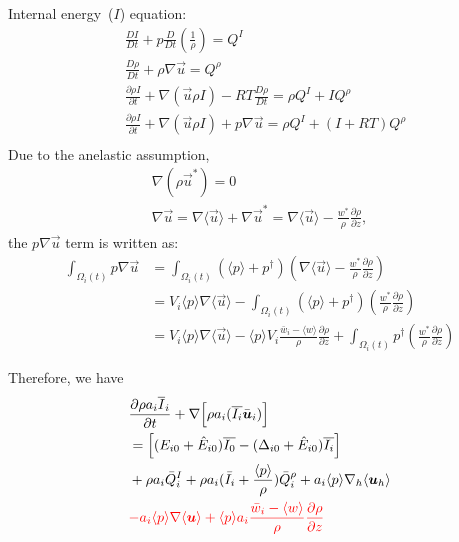 \documentclass{report}
\begin{document}
\newpage
Internal energy~($I$) equation:
\begin{align*}
 &\frac{D I}{D t} + p\frac{D}{Dt}\left(\frac{1}{\rho}\right) = Q^{I}\\
 &\frac{D \rho}{D t} + \rho\nabla \vec{u}  = Q^{\rho}\\
 &\frac{\partial \rho I}{\partial t} + \nabla\left(\vec{u}\rho I\right) - RT \frac{D\rho}{Dt} = \rho Q^{I} + IQ^{\rho}\\
 &\frac{\partial \rho I}{\partial t} + \nabla\left(\vec{u}\rho I\right) + p \nabla \vec{u}  = \rho Q^{I} + (I+RT)Q^{\rho}\\
\end{align*}
Due to the anelastic assumption, 
\begin{align*}
    \nabla (\rho \vec{u}^{*}) = 0\\
    \nabla \vec{u} = \nabla \langle\vec{u}\rangle + \nabla \vec{u}^* = \nabla \langle\vec{u}\rangle - \frac{w^{*}}{\rho}\frac{\partial \rho}{\partial z},
\end{align*} 
the $p \nabla \vec{u}$ term is written as:
\begin{align*}
\int_{\Omega_i(t)} p \nabla\vec{u} &= 
    \int_{\Omega_i(t)} (\langle p\rangle + p^{\dagger}) (\nabla \langle\vec{u}\rangle - \frac{w^{*}}{\rho}\frac{\partial \rho}{\partial z})\\
    &= V_i \langle p\rangle \nabla \langle\vec{u}\rangle - \int_{\Omega_i(t)} (\langle p\rangle + p^{\dagger}) (  \frac{w^{*}}{\rho}\frac{\partial \rho}{\partial z})\\
    &= V_i \langle p\rangle \nabla \langle\vec{u}\rangle - \langle p\rangle V_i  \frac{\bar{w}_i - \langle w \rangle}{\rho}\frac{\partial \rho}{\partial z} +
    \int_{\Omega_i(t)}  p^{\dagger} (  \frac{w^{*}}{\rho}\frac{\partial \rho}{\partial z})
\end{align*}

Therefore, we have 
\begin{align*}
&\frac{\partial \rho a_i \overline{I}_i}{\partial t} 
 + \nabla\Big[\rho a_i(\overline{I_i} \bar{\vec{u}}_i)\Big] \\
 &= \Big[(E_{i0} + \hat{E}_{i0}) \overline{I_0}  - (\Delta_{i0} + \hat{E}_{i0}) \overline{I_i} \Big]\\
 &+ \rho a_i \bar{Q}_i^{I} + \rho a_i (\bar{I}_i + \frac{\langle p\rangle}{\rho})\bar{Q}_i^{\rho} +  a_i \langle p \rangle \nabla_h \langle\vec{u}_h\rangle\\
    &  {\color{red}  -a_i  \langle p \rangle\nabla \langle \vec{u} \rangle  +  \langle p\rangle a_i  \frac{\bar{w}_i - \langle w \rangle}{\rho}\frac{\partial \rho}{\partial z} } \\
\end{align*}
\end{document}

